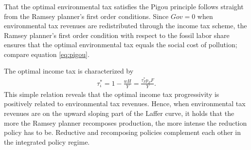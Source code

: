 	That the optimal environmental tax satisfies the Pigou principle follows straight from the Ramsey planner's first order conditions. Since $Gov=0$ when environmental tax revenues are redistributed through the income tax scheme, the Ramsey planner's first order condition with respect to the fossil labor share ensures that the optimal environmental tax equals the social cost of pollution; compare equation \ref{eq:pigou}. 
	
	 The optimal income tax is characterized by
\begin{align}
\tau^*_\iota=1-\frac{wH}{Y}=\frac{\tau_F^*p_FF}{Y}.
\end{align}
This simple relation reveals that the optimal income tax progressivity is positively related to environmental tax revenues.  %
Hence, when environmental tax revenues are on the upward sloping part of the Laffer curve, it holds that  the more the Ramsey planner recomposes production, the more intense the reduction policy has to be. Reductive and recomposing policies complement each other in the integrated policy regime. 
 
\begin{comment}
\begin{prop}
Effect of using progressive income scheme on inequality (maybe as opposed to lump-sum transfers)
\end{prop}

content...
\end{comment}

